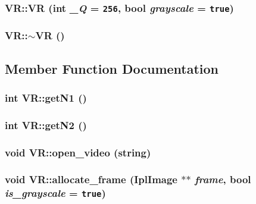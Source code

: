 \subsubsection{\setlength{\rightskip}{0pt plus 5cm}VR::VR (int {\em \_\-Q} = {\tt 256}, bool {\em grayscale} = {\tt true})\hspace{0.3cm}{\tt  [inline]}}\label{structVR_7a9a4bfc591cd088e075fea6994a3621}


\subsubsection{\setlength{\rightskip}{0pt plus 5cm}VR::$\sim$VR ()\hspace{0.3cm}{\tt  [inline]}}\label{structVR_2f66c1e5c17a512da3724ceef8916806}




\subsection{Member Function Documentation}
\subsubsection{\setlength{\rightskip}{0pt plus 5cm}int VR::getN1 ()\hspace{0.3cm}{\tt  [inline]}}\label{structVR_c573b73470296e0a30fbe9409a8fa2ba}


\subsubsection{\setlength{\rightskip}{0pt plus 5cm}int VR::getN2 ()\hspace{0.3cm}{\tt  [inline]}}\label{structVR_fb2e7dde8a4b26be7e8f946b87392767}


\subsubsection{\setlength{\rightskip}{0pt plus 5cm}void VR::open\_\-video (string)}\label{structVR_e2afbd979496c342490ff474b4db7e2c}


\subsubsection{\setlength{\rightskip}{0pt plus 5cm}void VR::allocate\_\-frame (IplImage $\ast$$\ast$ {\em frame}, bool {\em is\_\-grayscale} = {\tt true})}\label{structVR_26f09ed8b0b97b017cefc99e5f12334f}


